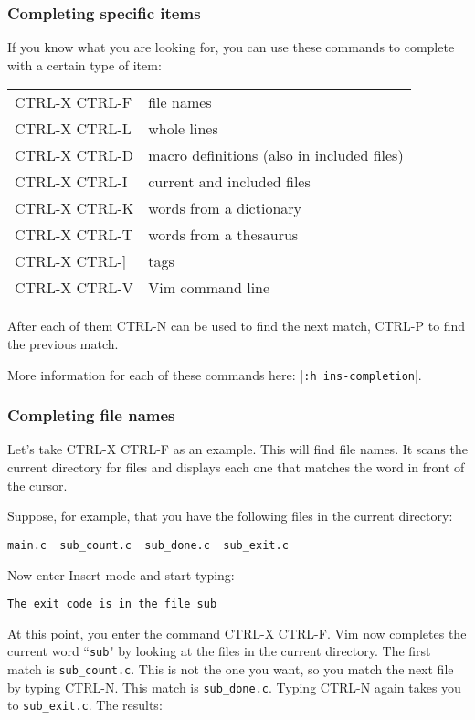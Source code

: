 \subsubsection{Completing specific items}
If you know what you are looking for, you can use these commands to complete with a certain type of item:
\begin{center} \begin{tabular}{l l}
				CTRL-X CTRL-F & file names \\
				CTRL-X CTRL-L & whole lines \\
				CTRL-X CTRL-D & macro definitions (also in included files) \\
				CTRL-X CTRL-I & current and included files \\
				CTRL-X CTRL-K & words from a dictionary \\
				CTRL-X CTRL-T & words from a thesaurus \\
				CTRL-X CTRL-] & tags \\
				CTRL-X CTRL-V & Vim command line \\
\end{tabular} \end{center}
After each of them CTRL-N can be used to find the next match, CTRL-P to find the previous match.

More information for each of these commands here: |\texttt{:h ins-completion}|.
\subsubsection{Completing file names}
Let's take CTRL-X CTRL-F as an example.
This will find file names.
It scans the current directory for files and displays each one that matches the word in front of the cursor.

Suppose, for example, that you have the following files in the current directory:

\begin{Verbatim}[samepage=true]
    main.c  sub_count.c  sub_done.c  sub_exit.c
\end{Verbatim}

Now enter Insert mode and start typing:

\begin{Verbatim}[samepage=true]
    The exit code is in the file sub 
\end{Verbatim}

At this point, you enter the command CTRL-X CTRL-F.
Vim now completes the current word ``\texttt{sub}" by looking at the files in the current directory.
The first match is \texttt{sub\_count.c}.
This is not the one you want, so you match the next file by typing CTRL-N.
This match is \texttt{sub\_done.c}.
Typing CTRL-N again takes you to \texttt{sub\_exit.c}.
The results:

